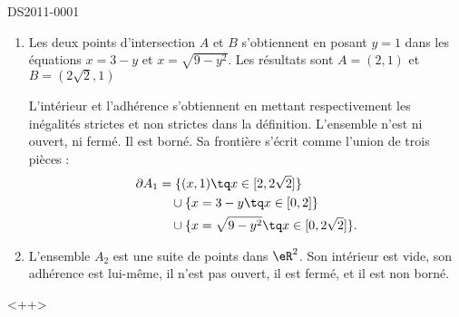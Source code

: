 \begin{corrige}{DS2011-0001}
  
    \begin{enumerate}
        \item
            


    \begin{center}
   
    \end{center}


    Les deux points d'intersection \( A\) et \( B\) s'obtiennent en posant \( y=1\) dans les équations \( x=3-y\) et \( x=\sqrt{9-y^2}\). Les résultats sont \( A=(2,1)\) et \( B=(2\sqrt{2},1)\)

    L'intérieur et l'adhérence s'obtiennent en mettant respectivement les inégalités strictes et non strictes dans la définition. L'ensemble n'est ni ouvert, ni fermé. Il est borné. Sa frontière s'écrit comme l'union de trois pièces :
    \begin{equation}
        \begin{aligned}[]
            \partial A_1&=\{ (x,1)\tq x\in\mathopen[ 2,2\sqrt{2}  \mathclose] \}\\
                &\quad\cup\{ x=3-y\tq x\in\mathopen[ 0 , 2 \mathclose] \}\\
                &\quad\cup\{ x=\sqrt{9-y^2}\tq x\in\mathopen[ 0 , 2\sqrt{2} \mathclose] \}.
        \end{aligned}
    \end{equation}

\item

    L'ensemble \( A_2\) est une suite de points dans \( \eR^2\). Son intérieur est vide, son adhérence est lui-même, il n'est pas ouvert, il est fermé, et il est non borné.
    \end{enumerate}
    <++>

\end{corrige}
